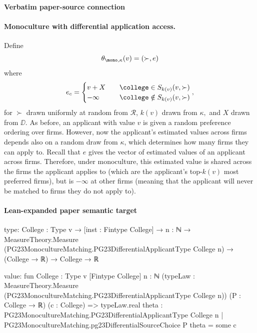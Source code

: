 \documentclass[10pt]{article}
\begin{document}
\paragraph{Verbatim paper-source connection}
\begin{ReviewVerbatim}
\paragraph{Monoculture with differential application access.} Define
\begin{equation}
    \theta_{\mono, \kappa}(v) = (\succ, e)
\end{equation}
where
\begin{equation}
    e_c =
    \begin{cases}
        v + X &\quad \college\in S_{k(v)}(v, \succ)\\
        -\infty &\quad \college\notin S_{k(v)}(v, \succ)
    \end{cases},
\end{equation}
for $\succ$ drawn uniformly at random from $\mathcal{R}$, $k(v)$ drawn from $\kappa,$ and $X$ drawn from $\DD$. As before, an applicant with value $v$ is given a random preference ordering over firms. However, now the applicant's estimated values across firms depends also on a random draw from $\kappa$, which determines how many firms they can apply to. Recall that $e$ gives the vector of estimated values of an applicant across firms. Therefore, under monoculture, this estimated value is shared across the firms the applicant applies to (which are the applicant's top-$k(v)$ most preferred firms), but is $-\infty$ at other firms (meaning that the applicant will never be matched to firms they do not apply to).
\end{ReviewVerbatim}



\paragraph{Lean-expanded paper semantic target}
\begin{ReviewVerbatim}
type:
{College : Type v} →
  [inst : Fintype College] →
    {n : ℕ} →
      MeasureTheory.Measure (PG23MonocultureMatching.PG23DifferentialApplicantType College n) →
        (College → ℝ) → College → ℝ

value:
fun {College : Type v} [Fintype College] {n : ℕ}
    (typeLaw : MeasureTheory.Measure (PG23MonocultureMatching.PG23DifferentialApplicantType College n))
    (P : College → ℝ) (c : College) =>
  typeLaw.real
    {theta : PG23MonocultureMatching.PG23DifferentialApplicantType College n |
      PG23MonocultureMatching.pg23DifferentialSourceChoice P theta = some c}
\end{ReviewVerbatim}
\end{document}
